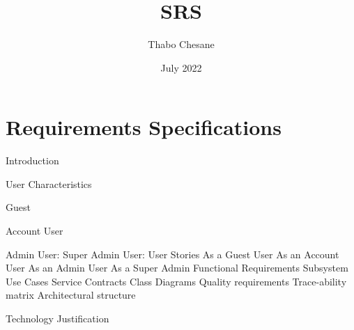 \documentclass{article}
\title{SRS}
\author{Thabo Chesane}
\date{July 2022}
\begin{document}
\maketitle

\section{Requirements Specifications	}

Introduction

User Characteristics

Guest

Account User

Admin User:	
Super Admin User:	
User Stories	
As a Guest User	
As an Account User	
As an Admin User	
As a Super Admin	
Functional Requirements	
Subsystem	
Use Cases	
Service Contracts	
Class Diagrams	
Quality requirements	
Trace-ability matrix	
Architectural structure	
 
Technology Justification	
\end{document}
